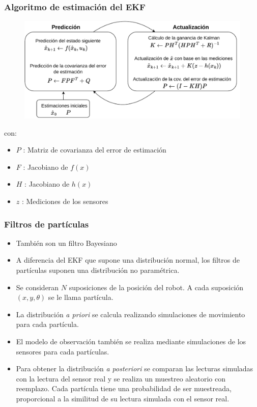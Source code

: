 \begin{frame}\frametitle{Algoritmo de estimación del EKF}
  \begin{figure}
    \centering
    \includegraphics[height=0.6\textheight]{Figures/MotionPlanning/EKFAlgorithm.pdf}
  \end{figure}
  con:
  \begin{itemize}
  \item $P$ : Matriz de covarianza del error de estimación
  \item $F$ : Jacobiano de $f(x)$
  \item $H$ : Jacobiano de $h(x)$
  \item $z$ : Mediciones de los sensores
  \end{itemize}
\end{frame}

\begin{frame}\frametitle{Filtros de partículas}
  \begin{itemize}
  \item También son un filtro Bayesiano
  \item A diferencia del EKF que supone una distribución normal, los filtros de partículas suponen una distribución no paramétrica.
  \item Se consideran $N$ suposiciones de la posición del robot. A cada suposición $(x,y,\theta)$ se le llama partícula. 
  \item La distribución \textit{a priori} se calcula realizando simulaciones de movimiento para cada partícula.
  \item El modelo de observación también se realiza mediante simulaciones de los sensores para cada partículas.
  \item Para obtener la distribución \textit{a posteriori} se comparan las lecturas simuladas con la lectura del sensor real y se realiza un muestreo aleatorio con reemplazo. Cada partícula tiene una probabilidad de ser muestreada, proporcional a la similitud de su lectura simulada con el sensor real.
  \end{itemize}
\end{frame}

